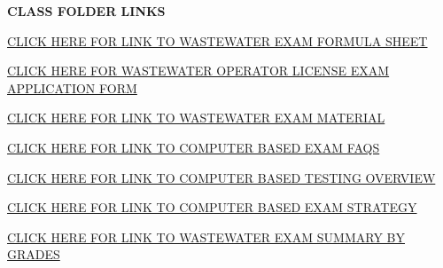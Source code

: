 \documentclass[titlepage]{article}
\begin{document}
\textbf{CLASS FOLDER LINKS}

\begin{tcolorbox}[width=17cm,box align=center, halign=center,  valign=center,colback={my-blue},title={}, colbacktitle=yellow,coltitle=blue]    
\href{https://drive.google.com/file/d/1BPez25mIjKvVi5f9bCbC5TUVdUvlnsaC/view?usp=sharing}{CLICK HERE FOR LINK TO WASTEWATER EXAM FORMULA SHEET}
\end{tcolorbox}

\begin{tcolorbox}[width=17cm,box align=center, halign=center,  valign=center,colback={my-blue},title={}, colbacktitle=yellow,coltitle=blue]    
\href{https://www.waterboards.ca.gov/water_issues/programs/operator_certification/docs/forms/exam_app.pdf}{CLICK HERE FOR WASTEWATER OPERATOR LICENSE EXAM APPLICATION FORM}
\end{tcolorbox} 

\begin{tcolorbox}[width=17cm,box align=center, halign=center,  valign=center,colback={my-blue},title={}, colbacktitle=yellow,coltitle=blue]    
\href{https://drive.google.com/drive/folders/1zZqhq0f-6Ts4zeHfPE3xaIML0KHDyjzm?usp=sharing}{CLICK HERE FOR LINK TO WASTEWATER EXAM MATERIAL}
\end{tcolorbox}

\begin{tcolorbox}[width=17cm,box align=center, halign=center,  valign=center,colback={my-blue},title={}, colbacktitle=yellow,coltitle=blue]    
\href{https://drive.google.com/file/d/1HLpG_eoiTMuZYX40JndYXzKpx7GLPo3X/view?usp=sharing}{CLICK HERE FOR LINK TO COMPUTER BASED EXAM FAQS}
\end{tcolorbox}

\begin{tcolorbox}[width=17cm,box align=center, halign=center,  valign=center,colback={my-blue},title={}, colbacktitle=yellow,coltitle=blue]    
\href{https://drive.google.com/file/d/1eXn6HIU0P0hpKcFrkv180VXgavw03iT7/view?usp=share_link}{CLICK HERE FOR LINK TO COMPUTER BASED TESTING OVERVIEW}
\end{tcolorbox}

\begin{tcolorbox}[width=17cm,box align=center, halign=center,  valign=center,colback={my-blue},title={}, colbacktitle=yellow,coltitle=blue]    
\href{https://drive.google.com/file/d/1vKWkFX7PSiBR25SA2nIYFGO2w9bMkO7k/view?usp=sharing}{CLICK HERE FOR LINK TO COMPUTER BASED EXAM STRATEGY}
\end{tcolorbox}

\begin{tcolorbox}[width=17cm,box align=center, halign=center,  valign=center,colback={my-blue},title={}, colbacktitle=yellow,coltitle=blue]    
\href{https://drive.google.com/file/d/1NEW8nDjjz6CzDiD4xNSFS-CyvmQoCbQJ/view?usp=sharing}{CLICK HERE FOR LINK TO WASTEWATER EXAM SUMMARY BY GRADES}
\end{tcolorbox}
\end{document}

